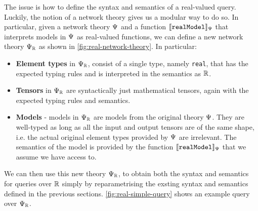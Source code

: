 The issue is how to define the syntax and semantics of a real-valued query.
Luckily, the notion of a network theory gives us a modular way to do so. In particular, given a network theory $\Psi$ and a function $\llbracket \mathtt{realModel} \rrbracket_\Psi$ that interprets models in $\Psi$ as real-valued functions, we can define a new network theory $\Psi_{\mathbb{R}}$ as shown in \autoref{fig:real-network-theory}. In particular:
\begin{itemize}
\item \textbf{Element types} in $\Psi_{\mathbb{R}}$, consist of a single type, namely \texttt{real}, that has the expected typing rules and is interpreted in the semantics as $\mathbb{R}$.
\item \textbf{Tensors} in $\Psi_{\mathbb{R}}$ are syntactically just mathematical tensors, again with the expected typing rules and semantics.
\item \textbf{Models} - models in $\Psi_{\mathbb{R}}$ are models from the original theory $\Psi$. They are well-typed as long as all the input and output tensors are of the same shape, i.e. the actual original element types provided by $\Psi$ are irrelevant. The semantics of the model is provided by the function $\llbracket \mathtt{realModel} \rrbracket_\Psi$ that we assume we have access to.
\end{itemize}
We can then use this new theory $\Psi_{\mathbb{R}}$, to obtain both the syntax and semantics for queries over $\mathbb{R}$ simply by reparametrising the exsting syntax and semantics defined in the previous sections. \autoref{fig:real-simple-query} shows an example query over $\Psi_{\mathbb{R}}$.